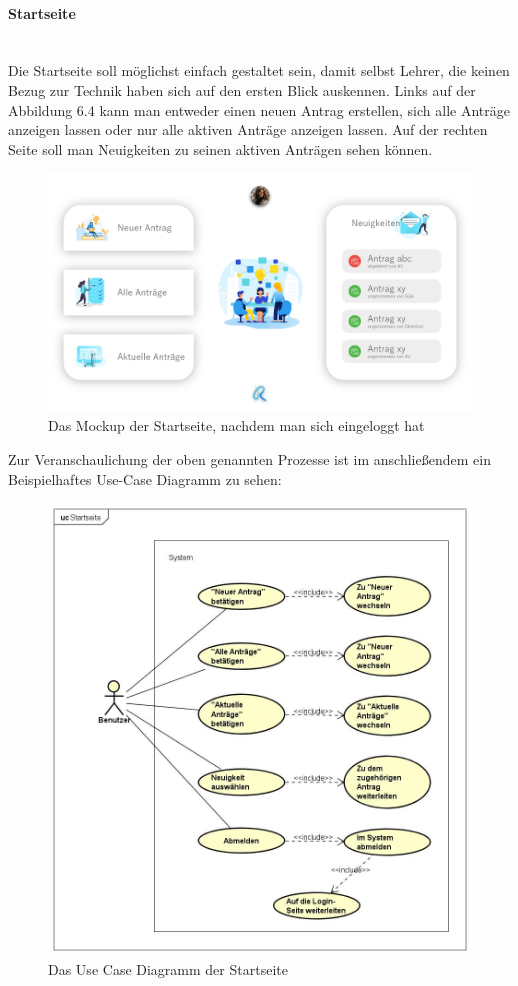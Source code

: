 \paragraph{Startseite}
~\\
Die Startseite soll möglichst einfach gestaltet sein, damit selbst Lehrer, die keinen Bezug zur Technik haben sich auf den ersten Blick auskennen. Links auf der Abbildung 6.4 kann man entweder einen neuen Antrag erstellen, sich alle Anträge anzeigen lassen oder nur alle aktiven Anträge anzeigen lassen. Auf der rechten Seite soll man Neuigkeiten zu seinen aktiven Anträgen sehen können.
\begin{figure}[H]
	\centering
	\includegraphics[width=1\linewidth]{images/Mockup-Startseite-eingeloggt}
	\caption[Mockup Startseite]{Das Mockup der Startseite, nachdem man sich eingeloggt hat}
	\label{fig:mockupStart}
\end{figure}
Zur Veranschaulichung der oben genannten Prozesse ist im anschließendem ein Beispielhaftes Use-Case Diagramm zu sehen: 
\begin{figure}[H]
	\centering
	\includegraphics[width=1\linewidth]{images/uc-start}
	\caption[Use Case Diagramm Login]{Das Use Case Diagramm der Startseite}
	\label{fig:ucStart}
\end{figure}

